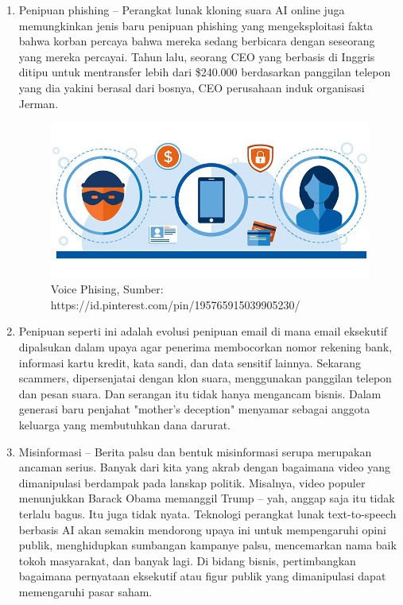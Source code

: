 \begin{enumerate}
\item Penipuan phishing – Perangkat lunak kloning suara AI online juga memungkinkan jenis baru penipuan phishing yang mengeksploitasi fakta bahwa korban percaya bahwa mereka sedang berbicara dengan seseorang yang mereka percayai. Tahun lalu, seorang CEO yang berbasis di Inggris ditipu untuk mentransfer lebih dari \$240.000 berdasarkan panggilan telepon yang dia yakini berasal dari bosnya, CEO perusahaan induk organisasi Jerman.
\begin{figure}[H]
        \centerline{\includegraphics[scale=.45]{figures/voice-phising}}
        \caption{Voice Phising, Sumber: https://id.pinterest.com/pin/195765915039905230/}
		\label{phising}
\end{figure}

\item Penipuan seperti ini adalah evolusi penipuan email di mana email eksekutif dipalsukan dalam upaya agar penerima membocorkan nomor rekening bank, informasi kartu kredit, kata sandi, dan data sensitif lainnya. Sekarang scammers, dipersenjatai dengan klon suara, menggunakan panggilan telepon dan pesan suara. Dan serangan itu tidak hanya mengancam bisnis. Dalam generasi baru penjahat "mother's deception" menyamar sebagai anggota keluarga yang membutuhkan dana darurat.

\item Misinformasi – Berita palsu dan bentuk misinformasi serupa merupakan ancaman serius. Banyak dari kita yang akrab dengan bagaimana video yang dimanipulasi berdampak pada lanskap politik. Misalnya, video populer menunjukkan Barack Obama memanggil Trump – yah, anggap saja itu tidak terlalu bagus. Itu juga tidak nyata. Teknologi perangkat lunak text-to-speech berbasis AI akan semakin mendorong upaya ini untuk mempengaruhi opini publik, menghidupkan sumbangan kampanye palsu, mencemarkan nama baik tokoh masyarakat, dan banyak lagi. Di bidang bisnis, pertimbangkan bagaimana pernyataan eksekutif atau figur publik yang dimanipulasi dapat memengaruhi pasar saham.


\end{enumerate}
